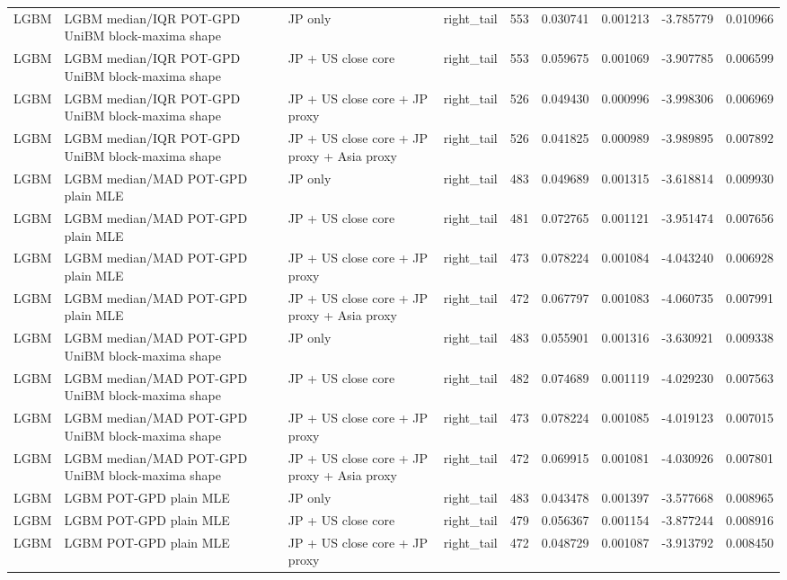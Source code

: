 \begin{tabular}{lll lrrrrr}
LGBM & LGBM median/IQR POT-GPD UniBM block-maxima shape & JP only & right\_tail & 553 & 0.030741 & 0.001213 & -3.785779 & 0.010966 \\
LGBM & LGBM median/IQR POT-GPD UniBM block-maxima shape & JP + US close core & right\_tail & 553 & 0.059675 & 0.001069 & -3.907785 & 0.006599 \\
LGBM & LGBM median/IQR POT-GPD UniBM block-maxima shape & JP + US close core + JP proxy & right\_tail & 526 & 0.049430 & 0.000996 & -3.998306 & 0.006969 \\
LGBM & LGBM median/IQR POT-GPD UniBM block-maxima shape & JP + US close core + JP proxy + Asia proxy & right\_tail & 526 & 0.041825 & 0.000989 & -3.989895 & 0.007892 \\
LGBM & LGBM median/MAD POT-GPD plain MLE & JP only & right\_tail & 483 & 0.049689 & 0.001315 & -3.618814 & 0.009930 \\
LGBM & LGBM median/MAD POT-GPD plain MLE & JP + US close core & right\_tail & 481 & 0.072765 & 0.001121 & -3.951474 & 0.007656 \\
LGBM & LGBM median/MAD POT-GPD plain MLE & JP + US close core + JP proxy & right\_tail & 473 & 0.078224 & 0.001084 & -4.043240 & 0.006928 \\
LGBM & LGBM median/MAD POT-GPD plain MLE & JP + US close core + JP proxy + Asia proxy & right\_tail & 472 & 0.067797 & 0.001083 & -4.060735 & 0.007991 \\
LGBM & LGBM median/MAD POT-GPD UniBM block-maxima shape & JP only & right\_tail & 483 & 0.055901 & 0.001316 & -3.630921 & 0.009338 \\
LGBM & LGBM median/MAD POT-GPD UniBM block-maxima shape & JP + US close core & right\_tail & 482 & 0.074689 & 0.001119 & -4.029230 & 0.007563 \\
LGBM & LGBM median/MAD POT-GPD UniBM block-maxima shape & JP + US close core + JP proxy & right\_tail & 473 & 0.078224 & 0.001085 & -4.019123 & 0.007015 \\
LGBM & LGBM median/MAD POT-GPD UniBM block-maxima shape & JP + US close core + JP proxy + Asia proxy & right\_tail & 472 & 0.069915 & 0.001081 & -4.030926 & 0.007801 \\
LGBM & LGBM POT-GPD plain MLE & JP only & right\_tail & 483 & 0.043478 & 0.001397 & -3.577668 & 0.008965 \\
LGBM & LGBM POT-GPD plain MLE & JP + US close core & right\_tail & 479 & 0.056367 & 0.001154 & -3.877244 & 0.008916 \\
LGBM & LGBM POT-GPD plain MLE & JP + US close core + JP proxy & right\_tail & 472 & 0.048729 & 0.001087 & -3.913792 & 0.008450 \\

\end{tabular}
